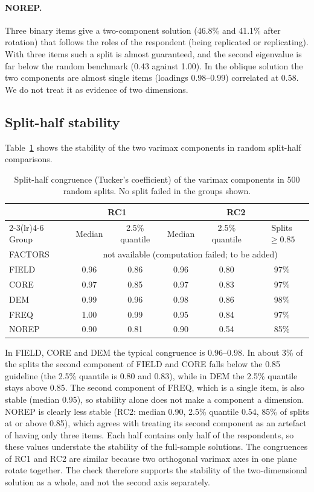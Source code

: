 \documentclass[11pt,a4paper]{article}
\begin{document}
\paragraph{NOREP.} Three binary items give a two-component solution (46.8\% and 41.1\% after rotation) that follows the roles of the respondent (being replicated or replicating). With three items such a split is almost guaranteed, and the second eigenvalue is far below the random benchmark (0.43 against 1.00). In the oblique solution the two components are almost single items (loadings 0.98--0.99) correlated at 0.58. We do not treat it as evidence of two dimensions.

\subsection{Split-half stability}

Table~\ref{tab:split} shows the stability of the two varimax components in random split-half comparisons.

\begin{table}[ht]
\centering
\small
\begin{tabular}{@{}l c c c c c@{}}
\toprule
 & \multicolumn{2}{c}{RC1} & \multicolumn{3}{c}{RC2}\\
\cmidrule(lr){2-3}\cmidrule(lr){4-6}
Group & Median & 2.5\% quantile & Median & 2.5\% quantile & Splits $\geq 0.85$\\
\midrule
FACTORS & \multicolumn{5}{c}{not available (computation failed; to be added)}\\
FIELD & 0.96 & 0.86 & 0.96 & 0.80 & 97\%\\
CORE  & 0.97 & 0.85 & 0.97 & 0.83 & 97\%\\
DEM   & 0.99 & 0.96 & 0.98 & 0.86 & 98\%\\
FREQ  & 1.00 & 0.99 & 0.95 & 0.84 & 97\%\\
NOREP & 0.90 & 0.81 & 0.90 & 0.54 & 85\%\\
\bottomrule
\end{tabular}
\caption{Split-half congruence (Tucker's coefficient) of the varimax components in 500 random splits. No split failed in the groups shown.}
\label{tab:split}
\end{table}

In FIELD, CORE and DEM the typical congruence is 0.96--0.98. In about 3\% of the splits the second component of FIELD and CORE falls below the 0.85 guideline (the 2.5\% quantile is 0.80 and 0.83), while in DEM the 2.5\% quantile stays above 0.85. The second component of FREQ, which is a single item, is also stable (median 0.95), so stability alone does not make a component a dimension. NOREP is clearly less stable (RC2: median 0.90, 2.5\% quantile 0.54, 85\% of splits at or above 0.85), which agrees with treating its second component as an artefact of having only three items. Each half contains only half of the respondents, so these values understate the stability of the full-sample solutions. The congruences of RC1 and RC2 are similar because two orthogonal varimax axes in one plane rotate together. The check therefore supports the stability of the two-dimensional solution as a whole, and not the second axis separately.
\end{document}
